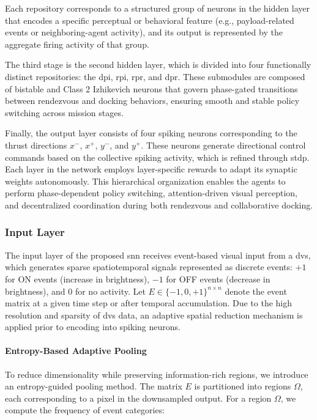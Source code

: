 Each repository corresponds to a structured group of neurons in the hidden layer that encodes a specific perceptual or behavioral feature (e.g., payload-related events or neighboring-agent activity), and its output is represented by the aggregate firing activity of that group.

The third stage is the second hidden layer, which is divided into four functionally distinct repositories: the \ac{dpi}, \ac{rpi}, \ac{rpr}, and \ac{dpr}. These submodules are composed of bistable and Class 2 Izhikevich neurons that govern phase-gated transitions between rendezvous and docking behaviors, ensuring smooth and stable policy switching across mission stages.

Finally, the output layer consists of four spiking neurons corresponding to the thrust directions \(x^{-}\), \(x^{+}\), \(y^{-}\), and \(y^{+}\). These neurons generate directional control commands based on the collective spiking activity, which is refined through \ac{stdp}. Each layer in the network employs layer-specific rewards to adapt its synaptic weights autonomously. This hierarchical organization enables the agents to perform phase-dependent policy switching, attention-driven visual perception, and decentralized coordination during both rendezvous and collaborative docking.

\subsubsection{Input Layer}

The input layer of the proposed \ac{snn} receives event-based visual input from a \ac{dvs}, which generates sparse spatiotemporal signals represented as discrete events: \(+1\) for ON events (increase in brightness), \(-1\) for OFF events (decrease in brightness), and \(0\) for no activity. Let \( E \in \{-1, 0, +1\}^{n \times n} \) denote the event matrix at a given time step or after temporal accumulation. Due to the high resolution and sparsity of \ac{dvs} data, an adaptive spatial reduction mechanism is applied prior to encoding into spiking neurons.

\paragraph{Entropy-Based Adaptive Pooling}

To reduce dimensionality while preserving information-rich regions, we introduce an entropy-guided pooling method. The matrix \( E \) is partitioned into regions \(\Omega\), each corresponding to a pixel in the downsampled output. For a region \(\Omega\), we compute the frequency of event categories:

